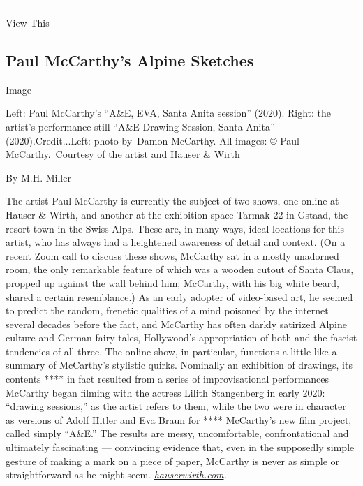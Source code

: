 \begin{center}\rule{0.5\linewidth}{\linethickness}\end{center}

View This

\hypertarget{paul-mccarthys-alpine-sketches}{%
\subsection{Paul McCarthy's Alpine
Sketches}\label{paul-mccarthys-alpine-sketches}}

Image

Left: Paul McCarthy's ``A\&E, EVA, Santa Anita session'' (2020). Right:
the artist's performance still ``A\&E Drawing Session, Santa Anita''
(2020).Credit...Left: photo by~Damon McCarthy. All images: © Paul
McCarthy.~Courtesy of the artist and Hauser \& Wirth

By M.H. Miller

The artist Paul McCarthy is currently the subject of two shows, one
online at Hauser \& Wirth, and another at the exhibition space Tarmak 22
in Gstaad, the resort town in the Swiss Alps. These are, in many ways,
ideal locations for this artist, who has always had a heightened
awareness of detail and context. (On a recent Zoom call to discuss these
shows, McCarthy sat in a mostly unadorned room, the only remarkable
feature of which was a wooden cutout of Santa Claus, propped up against
the wall behind him; McCarthy, with his big white beard, shared a
certain resemblance.) As an early adopter of video-based art, he seemed
to predict the random, frenetic qualities of a mind poisoned by the
internet several decades before the fact, and McCarthy has often darkly
satirized Alpine culture and German fairy tales, Hollywood's
appropriation of both and the fascist tendencies of all three. The
online show, in particular, functions a little like a summary of
McCarthy's stylistic quirks. Nominally an exhibition of drawings, its
contents **** in fact resulted from a series of improvisational
performances McCarthy began filming with the actress Lilith Stangenberg
in early 2020: ``drawing sessions,'' as the artist refers to them, while
the two were in character as versions of Adolf Hitler and Eva Braun for
**** McCarthy's new film project, called simply ``A\&E.'' The results
are messy, uncomfortable, confrontational and ultimately fascinating ---
convincing evidence that, even in the supposedly simple gesture of
making a mark on a piece of paper, McCarthy is never as simple or
straightforward as he might seem.
\href{https://www.hauserwirth.com/hauser-wirth-exhibitions/28962-paul-mccarthy-alpine-stories-dystopias}{\emph{hauserwirth.com}}\emph{.}

